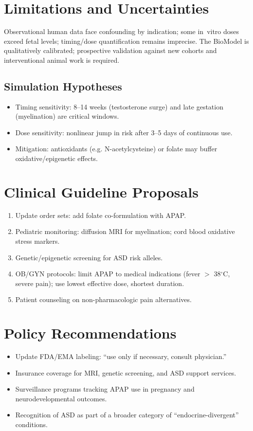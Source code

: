 \documentclass[12pt]{article}
\begin{document}
\section{Limitations and Uncertainties}
Observational human data face confounding by indication; some in~vitro doses exceed fetal levels; timing/dose quantification remains imprecise. The BioModel is qualitatively calibrated; prospective validation against new cohorts and interventional animal work is required.

\subsection{Simulation Hypotheses}
\begin{itemize}
    \item Timing sensitivity: 8--14 weeks (testosterone surge) and late gestation (myelination) are critical windows.
    \item Dose sensitivity: nonlinear jump in risk after 3--5 days of continuous use.
    \item Mitigation: antioxidants (e.g. N-acetylcysteine) or folate may buffer oxidative/epigenetic effects.
\end{itemize}

\section{Clinical Guideline Proposals}
\begin{enumerate}
    \item Update order sets: add folate co-formulation with APAP.
    \item Pediatric monitoring: diffusion MRI for myelination; cord blood oxidative stress markers.
    \item Genetic/epigenetic screening for ASD risk alleles.
    \item OB/GYN protocols: limit APAP to medical indications (fever $>$ 38$^\circ$C, severe pain); use lowest effective dose, shortest duration.
    \item Patient counseling on non-pharmacologic pain alternatives.
\end{enumerate}

\section{Policy Recommendations}
\begin{itemize}
    \item Update FDA/EMA labeling: ``use only if necessary, consult physician.''
    \item Insurance coverage for MRI, genetic screening, and ASD support services.
    \item Surveillance programs tracking APAP use in pregnancy and neurodevelopmental outcomes.
    \item Recognition of ASD as part of a broader category of ``endocrine-divergent'' conditions.
\end{itemize}
\end{document}

